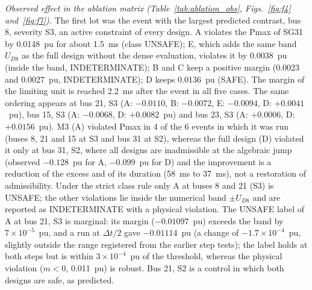 \emph{Observed effect in the ablation matrix (Table~\ref{tab:ablation_obs}, Figs.~\ref{fig:f4} and~\ref{fig:f7}).} The first lot was the event with the largest predicted contrast, bus 8, severity S3, an active constraint of every design. A violates the Pmax of SG31 by 0.0148~pu for about 1.5~ms (class UNSAFE); E, which adds the same band $U_{D8}$ as the full design without the dense evaluation, violates it by 0.0038~pu (inside the band, INDETERMINATE); B and C keep a positive margin (0.0023 and 0.0027~pu, INDETERMINATE); D keeps 0.0136~pu (SAFE). The margin of the limiting unit is reached 2.2~ms after the event in all five cases. The same ordering appears at bus 21, S3 (A: $-0.0110$, B: $-0.0072$, E: $-0.0094$, D: $+0.0041$~pu), bus 15, S3 (A: $-0.0068$, D: $+0.0082$~pu) and bus 23, S3 (A: $+0.0006$, D: $+0.0156$~pu). M3 (A) violated Pmax in 4 of the 6 events in which it was run (buses 8, 21 and 15 at S3 and bus 31 at S2), whereas the full design (D) violated it only at bus 31, S2, where all designs are inadmissible at the algebraic jump (observed $-0.128$~pu for A, $-0.099$~pu for D) and the improvement is a reduction of the excess and of its duration (58~ms to 37~ms), not a restoration of admissibility. Under the strict class rule only A at buses 8 and 21 (S3) is UNSAFE; the other violations lie inside the numerical band $\pm U_{D8}$ and are reported as INDETERMINATE with a physical violation. The UNSAFE label of A at bus 21, S3 is marginal: its margin ($-0.01097$~pu) exceeds the band by $7\times10^{-5}$~pu, and a run at $\Delta t/2$ gave $-0.01114$~pu (a change of $-1.7\times10^{-4}$~pu, slightly outside the range registered from the earlier step tests); the label holds at both steps but is within $3\times10^{-4}$~pu of the threshold, whereas the physical violation ($m<0$, 0.011~pu) is robust. Bus 21, S2 is a control in which both designs are safe, as predicted.

